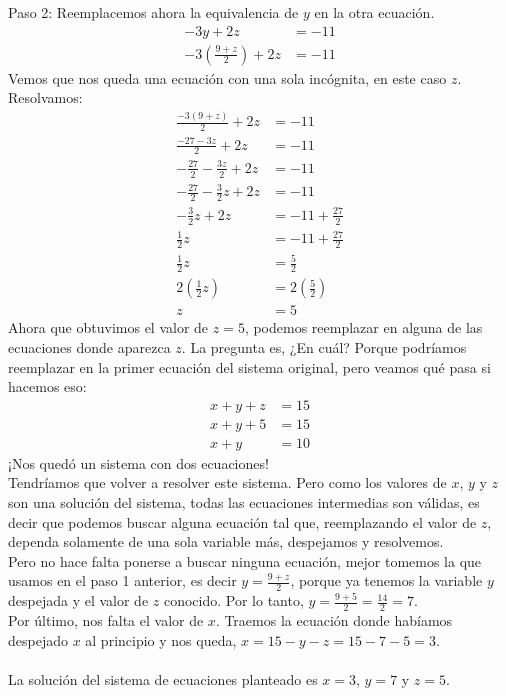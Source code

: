 \documentclass{article}
\begin{document}
\begin{ejemplo}
\begin{normalsize}
Paso 2: Reemplacemos ahora la equivalencia de $y$ en la otra ecuación.
\begin{align}
	-3y+2z&=-11\nonumber\\
	-3(\frac{9+z}{2})+2z&=-11\nonumber
\end{align}
Vemos que nos queda una ecuación con una sola incógnita, en este caso $z$. Resolvamos:
\begin{align}
	\frac{-3(9+z)}{2}+2z&=-11\nonumber\\
	\frac{-27-3z}{2}+2z&=-11\nonumber\\
	-\frac{27}{2}-\frac{3z}{2}+2z&=-11\nonumber\\
	-\frac{27}{2}-\frac{3}{2}z+2z&=-11\nonumber\\
	-\frac{3}{2}z+2z&=-11+\frac{27}{2}\nonumber\\
	\frac{1}{2}z&=-11+\frac{27}{2}\nonumber\\
	\frac{1}{2}z&=\frac{5}{2}\nonumber\\
	2(\frac{1}{2}z)&=2(\frac{5}{2})\nonumber\\
	z&=5\nonumber
\end{align}
Ahora que obtuvimos el valor de $z=5$, podemos reemplazar en alguna de las ecuaciones donde aparezca $z$. La pregunta es, ¿En cuál? Porque podríamos reemplazar en la primer ecuación del sistema original, pero veamos qué pasa si hacemos eso:
\begin{align}
	x+y+z&=15\nonumber\\
	x+y+5&=15\nonumber\\
	x+y&=10\nonumber
\end{align}
¡Nos quedó un sistema con dos ecuaciones!\\
Tendríamos que volver a resolver este sistema. Pero como los valores de $x$, $y$ y $z$ son una solución del sistema, todas las ecuaciones intermedias son válidas, es decir que podemos buscar alguna ecuación tal que, reemplazando el valor de $z$, dependa solamente de una sola variable más, despejamos y resolvemos.\\
Pero no hace falta ponerse a buscar ninguna ecuación, mejor tomemos la que usamos en el paso 1 anterior, es decir $y=\frac{9+z}{2}$, porque ya tenemos la variable $y$ despejada y el valor de $z$ conocido. Por lo tanto, $y=\frac{9+5}{2}=\frac{14}{2}=7$.\\
Por último, nos falta el valor de $x$. Traemos la ecuación donde habíamos despejado $x$ al principio y nos queda, $x=15-y-z=15-7-5=3$.\\\\
La solución del sistema de ecuaciones planteado es $x=3$, $y=7$ y $z=5$.
\end{normalsize}
\end{ejemplo}
\end{document}
